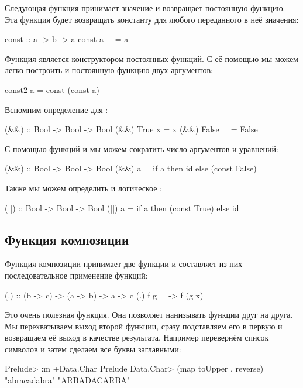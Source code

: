 Следующая функция  принимает значение и возвращает
постоянную функцию. Эта функция будет возвращать константу
для любого переданного в неё значения:

\begin{code}
const :: a -> b -> a
const a _ = a
\end{code}

Функция  является конструктором постоянных
функций. С её помощью мы можем легко построить и постоянную
функцию двух аргументов:

\begin{code}
const2 a = const (const a)
\end{code}

Вспомним определение для \In{&&}:

\begin{code}
(&&) :: Bool -> Bool -> Bool
(&&) True   x  = x
(&&) False  _  = False  
\end{code}

С помощью функций  и  мы можем сократить число 
аргументов и уравнений:

\begin{code}
(&&) :: Bool -> Bool -> Bool
(&&) a = if a then id else (const False)
\end{code}

Также мы можем определить и логическое :

\begin{code}
(||) :: Bool -> Bool -> Bool
(||) a = if a then (const True) else id
\end{code}

\subsection{Функция композиции}

Функция композиции принимает две функции и составляет
из них последовательное применение функций:

\begin{code}
(.) :: (b -> c) -> (a -> b) -> a -> c
(.) f g = \x -> f (g x)
\end{code}

Это очень полезная функция. Она позволяет нанизывать
функции друг на друга. Мы перехватываем выход второй функции,
сразу подставляем его в первую и возвращаем её выход в качестве
результата. Например перевернём список символов и затем 
сделаем все буквы заглавными:

\begin{code}
Prelude> :m +Data.Char
Prelude Data.Char> (map toUpper . reverse) "abracadabra"
"ARBADACARBA"
\end{code}

